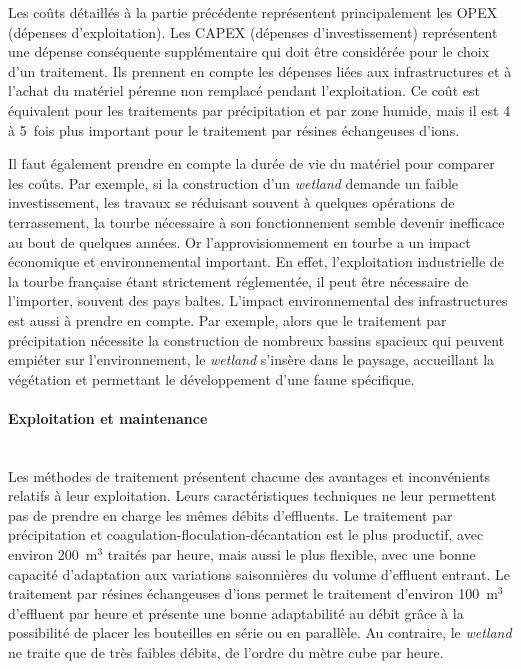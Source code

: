 \documentclass{article}
\begin{document}
Les coûts détaillés à la partie précédente représentent principalement les OPEX (dépenses d’exploitation). Les CAPEX (dépenses d’investissement) représentent une dépense conséquente supplémentaire qui doit être considérée pour le choix d'un traitement. Ils prennent en compte les dépenses liées aux infrastructures et à l’achat du matériel pérenne non remplacé pendant l’exploitation. Ce coût est équivalent pour les traitements par précipitation et par zone humide, mais il est 4 à 5~fois plus important pour le traitement par résines échangeuses d’ions.

Il faut également prendre en compte la durée de vie du matériel pour comparer les coûts. Par exemple, si la construction d’un \textit{wetland} demande un faible investissement, les travaux se réduisant souvent à quelques opérations de terrassement, la tourbe nécessaire à son fonctionnement semble devenir inefficace au bout de quelques années. Or l’approvisionnement en tourbe a un impact économique et environnemental important. En effet, l’exploitation industrielle de la tourbe française étant strictement réglementée, il peut être nécessaire de l’importer, souvent des pays baltes. L’impact environnemental des infrastructures est aussi à prendre en compte. Par exemple, alors que le traitement par précipitation nécessite la construction de nombreux bassins spacieux qui peuvent empiéter sur l’environnement, le \textit{wetland} s’insère dans le paysage, accueillant la végétation et permettant le développement d’une faune spécifique.

\paragraph{Exploitation et maintenance \\ \\}

Les méthodes de traitement présentent chacune des avantages et inconvénients relatifs à leur exploitation. Leurs caractéristiques techniques ne leur permettent pas de prendre en charge les mêmes débits d’effluents. Le traitement par précipitation et coagulation-floculation-décantation est le plus productif, avec environ 200~$\text{m}^3$ traités par heure, mais aussi le plus flexible, avec une bonne capacité d’adaptation aux variations saisonnières du volume d’effluent entrant. Le traitement par résines échangeuses d’ions permet le traitement d’environ 100~$\text{m}^3$ d’effluent par heure et présente une bonne adaptabilité au débit grâce à la possibilité de placer les bouteilles en série ou en parallèle. Au contraire, le \textit{wetland} ne traite que de très faibles débits, de l’ordre du mètre cube par heure.
\end{document}
